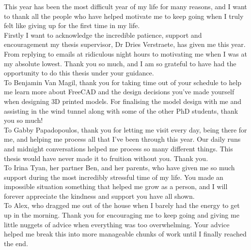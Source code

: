 \begin{acknowledgements}  

This year has been the most difficult year of my life for many reasons, and I want to thank all the people who have helped motivate me to keep going when I truly felt like giving up for the first time in my life. \\
Firstly I want to acknowledge the incredible patience, support and encouragement my thesis supervisor, Dr Dries Verstraete, has given me this year. From replying to emails at ridiculous night hours to motivating me when I was at my absolute lowest. Thank you so much, and I am so grateful to have had the opportunity to do this thesis under your guidance.  \\
To Benjamin Van Magil, thank you for taking time out of your schedule to help me learn more about FreeCAD and the design decisions you've made yourself when designing 3D printed models. For finalising the model design with me and assisting in the wind tunnel along with some of the other PhD students, thank you so much! \\
To Gabby Papadopoulos, thank you for letting me visit every day, being there for me, and helping me process all that I've been through this year. Our daily runs and midnight conversations helped me process so many different things. This thesis would have never made it to fruition without you. Thank you.\\
To Irina Tyan, her partner Ben, and her parents, who have given me so much support during the most incredibly stressful time of my life. You made an impossible situation something that helped me grow as a person, and I will forever appreciate the kindness and support you have all shown.\\
To Alex, who dragged me out of the house when I barely had the energy to get up in the morning. Thank you for encouraging me to keep going and giving me little nuggets of advice when everything was too overwhelming. Your advice helped me break this into more manageable chunks of work until I finally reached the end. 



\end{acknowledgements}